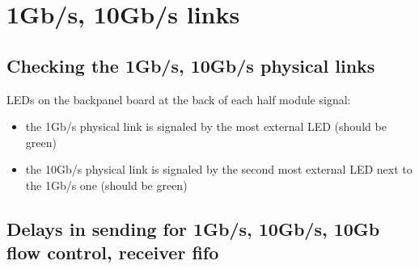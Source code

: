 \documentclass{article}
\begin{document}
\section{1Gb/s, 10Gb/s links}
\subsection{Checking the 1Gb/s, 10Gb/s physical links}
LEDs on the backpanel board at the back of each half module signal:
\begin{itemize}
\item  the 1Gb/s physical link is signaled by the most external LED (should be green) 
\item the 10Gb/s physical link is signaled by the second most external LED next to the 1Gb/s one (should be green) 
\end{itemize}

\subsection{Delays in sending for 1Gb/s, 10Gb/s, 10Gb flow control, receiver fifo}
\end{document}
